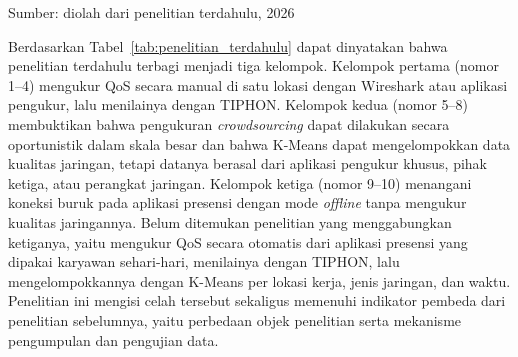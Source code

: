 \vspace{-6pt}
{\raggedright\footnotesize Sumber: diolah dari penelitian terdahulu, 2026\par}

Berdasarkan Tabel~\ref{tab:penelitian_terdahulu} dapat dinyatakan bahwa penelitian terdahulu terbagi menjadi tiga kelompok. Kelompok pertama (nomor 1--4) mengukur QoS secara manual di satu lokasi dengan Wireshark atau aplikasi pengukur, lalu menilainya dengan TIPHON. Kelompok kedua (nomor 5--8) membuktikan bahwa pengukuran \textit{crowdsourcing} dapat dilakukan secara oportunistik dalam skala besar dan bahwa K-Means dapat mengelompokkan data kualitas jaringan, tetapi datanya berasal dari aplikasi pengukur khusus, pihak ketiga, atau perangkat jaringan. Kelompok ketiga (nomor 9--10) menangani koneksi buruk pada aplikasi presensi dengan mode \textit{offline} tanpa mengukur kualitas jaringannya. Belum ditemukan penelitian yang menggabungkan ketiganya, yaitu mengukur QoS secara otomatis dari aplikasi presensi yang dipakai karyawan sehari-hari, menilainya dengan TIPHON, lalu mengelompokkannya dengan K-Means per lokasi kerja, jenis jaringan, dan waktu. Penelitian ini mengisi celah tersebut sekaligus memenuhi indikator pembeda dari penelitian sebelumnya, yaitu perbedaan objek penelitian serta mekanisme pengumpulan dan pengujian data.
